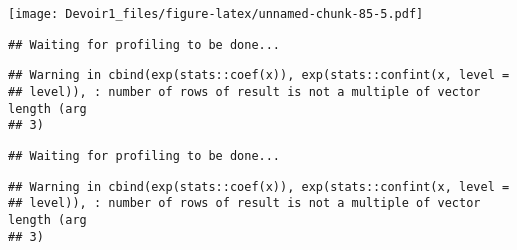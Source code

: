\documentclass[]{article}
\newenvironment{Shaded}{\begin{snugshade}}{\end{snugshade}}
\newcommand{\KeywordTok}[1]{\textcolor[rgb]{0.13,0.29,0.53}{\textbf{#1}}}
\newcommand{\DataTypeTok}[1]{\textcolor[rgb]{0.13,0.29,0.53}{#1}}
\newcommand{\DecValTok}[1]{\textcolor[rgb]{0.00,0.00,0.81}{#1}}
\newcommand{\StringTok}[1]{\textcolor[rgb]{0.31,0.60,0.02}{#1}}
\newcommand{\OperatorTok}[1]{\textcolor[rgb]{0.81,0.36,0.00}{\textbf{#1}}}
\newcommand{\NormalTok}[1]{#1}
\begin{document}
\texttt{[image: Devoir1\_files/figure-latex/unnamed-chunk-85-5.pdf]}

\begin{Shaded}
\end{Shaded}

\begin{verbatim}
## Waiting for profiling to be done...
\end{verbatim}

\begin{verbatim}
## Warning in cbind(exp(stats::coef(x)), exp(stats::confint(x, level =
## level)), : number of rows of result is not a multiple of vector length (arg
## 3)
\end{verbatim}

\begin{verbatim}
## Waiting for profiling to be done...
\end{verbatim}

\begin{verbatim}
## Warning in cbind(exp(stats::coef(x)), exp(stats::confint(x, level =
## level)), : number of rows of result is not a multiple of vector length (arg
## 3)
\end{verbatim}
\end{document}
